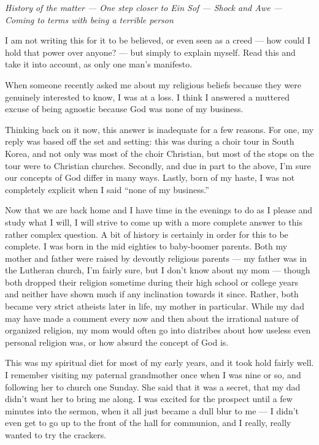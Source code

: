 \emph{History of the matter --- One step closer to Ein Sof --- Shock and Awe --- Coming to terms with being a terrible person}

I am not writing this for it to be believed, or even seen as a creed --- how could I hold that power over anyone? --- but simply to explain myself. Read this and take it into account, as only one man's manifesto.

When someone recently asked me about my religious beliefs because they were genuinely interested to know, I was at a loss. I think I answered a muttered excuse of being agnostic because God was none of my business.

Thinking back on it now, this answer is inadequate for a few reasons. For one, my reply was based off the set and setting: this was during a choir tour in South Korea, and not only was most of the choir Christian, but most of the stops on the tour were to Christian churches. Secondly, and due in part to the above, I'm sure our concepts of God differ in many ways. Lastly, born of my haste, I was not completely explicit when I said ``none of my business.''

Now that we are back home and I have time in the evenings to do as I please and study what I will, I will strive to come up with a more complete answer to this rather complex question. A bit of history is certainly in order for this to be complete. I was born in the mid eighties to baby-boomer parents. Both my mother and father were raised by devoutly religious parents --- my father was in the Lutheran church, I'm fairly sure, but I don't know about my mom --- though both dropped their religion sometime during their high school or college years and neither have shown much if any inclination towards it since. Rather, both became very strict atheists later in life, my mother in particular. While my dad may have made a comment every now and then about the irrational nature of organized religion, my mom would often go into diatribes about how useless even personal religion was, or how absurd the concept of God is.

This was my spiritual diet for most of my early years, and it took hold fairly well. I remember visiting my paternal grandmother once when I was nine or so, and following her to church one Sunday. She said that it was a secret, that my dad didn't want her to bring me along. I was excited for the prospect until a few minutes into the sermon, when it all just became a dull blur to me --- I didn't even get to go up to the front of the hall for communion, and I really, really wanted to try the crackers.

